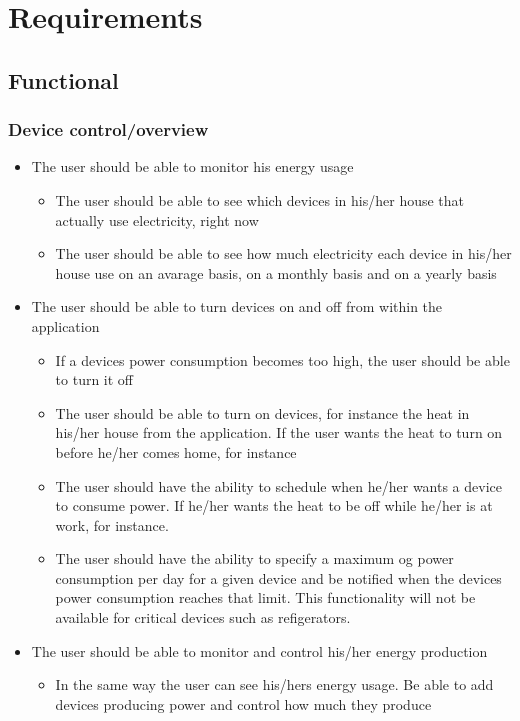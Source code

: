 \section{Requirements}
\subsection{Functional}

\subsubsection{Device control/overview}
\begin{itemize}
\item The user should be able to monitor his energy usage
\begin{itemize}
\item The user should be able to see which devices in his/her house that actually use electricity, right now
\item The user should be able to see how much electricity each device in his/her house use on an avarage basis, on a monthly basis and on a yearly basis 
\end{itemize}

\item The user should be able to turn devices on and off from within the application
\begin{itemize}
\item If a devices power consumption becomes too high, the user should be able to turn it off
\item The user should be able to turn on devices, for instance the heat in his/her house from the application. If the user wants the heat to turn on before he/her comes home, for instance
\item The user should have the ability to schedule when he/her wants a device to consume power. If he/her wants the heat to be off while he/her is at work, for instance. 
\item The user should have the ability to specify a maximum og power 
consumption per day for a given device and be notified when the devices power
consumption reaches that limit. This functionality will not be available
for critical devices such as refigerators. 
\end{itemize}

\item The user should be able to monitor and control his/her energy production
\begin{itemize}
\item In the same way the user can see his/hers energy usage. Be able to add devices producing power and control how much they produce
\end{itemize}
\end{itemize}

